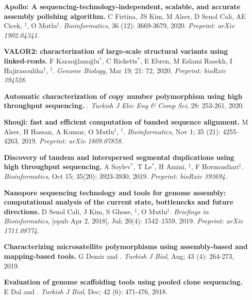 \vspace{-.2cm}
{\bf Apollo: A sequencing-technology-independent, scalable, and accurate assembly polishing algorithm.} C Firtina, JS Kim, M Alser, D Senol Cali, AE Cicek, \calkan{}$^\ddag$, O Mutlu$^\ddag$. {\it Bioinformatics}, 36 (12): 3669-3679, 2020.
\textit{Preprint: arXiv 1902.04341.}

\vspace{-.2cm}
 {\bf VALOR2: characterization of large-scale structural variants using linked-reads.}
 F Karaoğlanoğlu$^*$, C Ricketts$^*$, E Ebren, M Eslami Rasekh,  I Hajirasouliha$^\ddag$, \calkan{}$^\ddag$.
{\it Genome Biology}, Mar 19; 21: 72, 2020.  \textit{Preprint: bioRxiv 394528.}


   \vspace{-.2cm}
         {\bf Automatic characterization of copy number polymorphism using high throughput sequencing.}  \calkan{}. {\em Turkish J Elec Eng \& Comp Sci}, 28: 253-261, 2020.
         
\vspace{-.2cm}
{\bf Shouji: fast and efficient computation of banded sequence alignment.} M Alser, H Hassan, A Kumar, O Mutlu$^\ddag$, \calkan{}$^\ddag$.
{\em Bioinformatics}, Nov 1; 35 (21): 4255–4263, 2019. \textit{Preprint: arXiv 1809.07858.}


\vspace{-.2cm}
 {\bf Discovery of tandem and interspersed segmental duplications using high throughput sequencing.}
 A Soylev$^*$, T Le$^*$, H Amini, \calkan{}$^\ddag$, F Hormozdiari$^\ddag$.
{\em Bioinformatics}, Oct 15; 35(20): 3923-3930, 2019. \textit{Preprint: bioRxiv 393694.}


        \clearpage
        
\vspace{-.2cm}

         {\bf Nanopore sequencing technology and tools for genome assembly: computational analysis of the current state, bottlenecks and future directions.}
         D Senol Cali, J Kim, S Ghose, \calkan{}$^\ddag$, O Mutlu$^\ddag$.
         {\em Briefings in Bioinformatics}, [epub Apr 2, 2018], Jul; 20(4): 1542–1559, 2019. \textit{Preprint: arXiv 1711.08774.}

\vspace{-.2cm}
         {\bf Characterizing microsatellite polymorphisms using assembly-based and mapping-based tools.}  G Demir and \calkan{}. {\em Turkish J Biol}, Aug; 43 (4): 264-273, 2019.


         \vspace{-.2cm}
         {\bf Evaluation of genome scaffolding tools using pooled clone sequencing.}  E Dal and \calkan{}. {\em Turkish J Biol}, Dec; 42 (6): 471-476, 2018.
         
